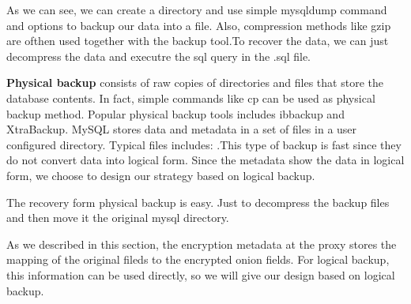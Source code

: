 


As we can see, we can create a directory and use simple mysqldump command and options to backup our data into a file. Also, compression methods like gzip are ofthen used together with the backup tool.To recover the data, we can just decompress the data and executre the sql query in the .sql file. 


\textbf{Physical backup} consists of raw copies of directories and files that store the database contents\citep{mysqlbackupdocumentation}. In fact, simple commands like cp can be used as physical backup method. Popular physical backup tools includes ibbackup and XtraBackup\citep{xtrabackup}. MySQL stores data and metadata in a set of files in a user configured directory. Typical files includes:  .This type of backup is fast since they do not convert data into logical form. Since the metadata show the data in logical form, we choose to design our strategy based on logical backup. 



The recovery form physical backup is easy. Just to decompress the backup files and then move it the original mysql directory. 



As we described in this section, the encryption metadata at the proxy stores the mapping of the original fileds to the encrypted onion fields. For logical backup, this information can be used directly, so we will give our design based on logical backup.
